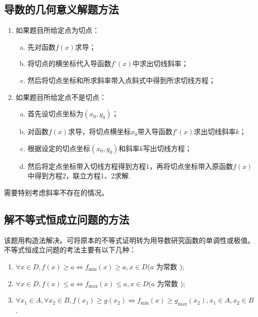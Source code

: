   \subsection{导数的几何意义解题方法}
    \begin{enumerate}[(1)]
      \item 如果题目所给定点为切点：
        \begin{enumerate}[(a)]
          \item 先对函数$f(x)$求导；
          \item 将切点的横坐标代入导函数$f’(x)$中求出切线斜率；
          \item 然后将切点坐标和所求斜率带入点斜式中得到所求切线方程；
        \end{enumerate}
      \item 如果题目所给定点不是切点：
        \begin{enumerate}[(a)]
          \item 首先设切点坐标为$(x_0,y_0)$；
          \item 对函数$f(x)$求导，将切点横坐标$x_0$带入导函数$f’(x)$求出切线斜率$k$；
          \item 根据设定的切点坐标$(x_0,y_0)$和斜率$k$写出切线方程；
          \item 然后将定点坐标带入切线方程得到方程1，再将切点坐标带入原函数$f(x)$中得到方程2，联立方程1、2求解\cite{张美娟2017高中数学}.
        \end{enumerate}
    \end{enumerate}

    需要特别考虑斜率不存在的情况。

  \subsection{解不等式恒成立问题的方法}
    该题用构造法解决。可将原本的不等式证明转为用导数研究函数的单调性或极值。不等式恒成立问题的考法主要有以下几种\cite{惠红民一题一课}：
    \begin{enumerate}[(1)]
      \item $\forall x \in D, f(x) \geq a \Leftrightarrow f_{\min }(x) \geq a, x \in D$($a$ 为常数 );
      \item $\forall x \in D, f({x}) \leq a \Leftrightarrow f_{\max }(x) \leq a, x \in D$($a$ 为常数 );
      \item $\forall x_{1} \in A, \forall x_{2} \in B, f\left(x_{1}\right) \geq g\left(x_{2}\right) \Leftrightarrow f_{\min }(x) \geq g_{\max }\left(x_{2}\right), x_{1} \in A, x_{2} \in B$.
    \end{enumerate}
